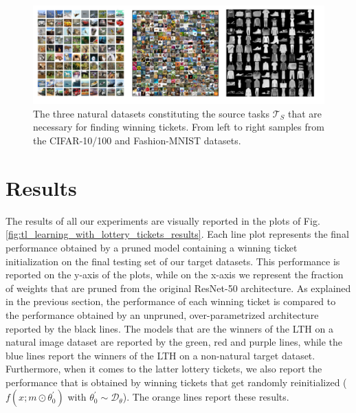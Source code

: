 \begin{figure}
  \centering
   \includegraphics[width=\linewidth,height=\textheight,keepaspectratio]{./Images/Chapter06/natural_datasets.png}
   \caption{The three natural datasets constituting the source tasks $\mathcal{T}_S$ that are necessary for finding winning tickets. From left to right samples from the CIFAR-10/100 and Fashion-MNIST datasets.}
\label{fig:natural_source_datasets}
\end{figure}


\section{Results}
\label{sec:results}
The results of all our experiments are visually reported in the plots of Fig. \ref{fig:tl_learning_with_lottery_tickets_results}. Each line plot represents the final performance obtained by a pruned model containing a winning ticket initialization on the final testing set of our target datasets. This performance is reported on the y-axis of the plots, while on the x-axis we represent the fraction of weights that are pruned from the original ResNet-50 architecture. As explained in the previous section, the performance of each winning ticket is compared to the performance obtained by an unpruned, over-parametrized architecture reported by the black lines. The models that are the winners of the LTH on a natural image dataset are reported by the green, red and purple lines, while the blue lines report the winners of the LTH on a non-natural target dataset. Furthermore, when it comes to the latter lottery tickets, we also report the performance that is obtained by winning tickets that get randomly reinitialized ($f(x;m\odot\theta^{'}_{0})$ with $\theta^{'}_{0} \sim \mathscr{D}_\theta$). The orange lines report these results. 

